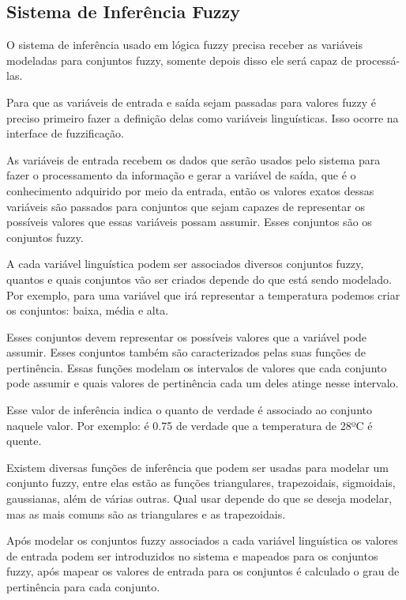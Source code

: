 \documentclass[
	article,			%
	11pt,				%
	oneside,			%
	a4paper,			%
	english,			%
	brazil,				%
	sumario=tradicional
	]{abntex2}
\begin{document}
\begin{multicols}{2}
\subsection{Sistema de Inferência Fuzzy}

O sistema de inferência usado em lógica fuzzy precisa receber as variáveis modeladas para conjuntos fuzzy, somente depois disso ele será capaz de processá-las.

Para que as variáveis de entrada e saída sejam passadas para valores fuzzy é preciso primeiro fazer a definição delas como variáveis linguísticas. Isso ocorre na interface de fuzzificação.

As variáveis de entrada recebem os dados que serão usados pelo sistema para fazer o processamento da informação e gerar a variável de saída, que é o conhecimento adquirido por meio da entrada, então os valores exatos dessas variáveis são passados para conjuntos que sejam capazes de representar os possíveis valores que essas variáveis possam assumir. Esses conjuntos são os conjuntos fuzzy.

A cada variável linguística podem ser associados diversos conjuntos fuzzy, quantos e quais conjuntos vão ser criados depende do que está sendo modelado. Por exemplo, para uma variável que irá representar a temperatura podemos criar os conjuntos: baixa, média e alta.

Esses conjuntos devem representar os possíveis valores que a variável pode assumir. Esses conjuntos também são caracterizados pelas suas funções de pertinência. Essas funções modelam os intervalos de valores que cada conjunto pode assumir e quais valores de pertinência cada um deles atinge nesse intervalo.

Esse valor de inferência indica o quanto de verdade é associado ao conjunto naquele valor. Por exemplo: é 0.75 de verdade que a temperatura de 28ºC é quente.

Existem diversas funções de inferência que podem ser usadas para modelar um conjunto fuzzy, entre elas estão as funções triangulares, trapezoidais, sigmoidais, gaussianas, além de várias outras. Qual usar depende do que se deseja modelar, mas as mais comuns são as triangulares e as trapezoidais.

Após modelar os conjuntos fuzzy associados a cada variável linguística os valores de entrada podem ser introduzidos no sistema e mapeados para os conjuntos fuzzy, após mapear os valores de entrada para os conjuntos é calculado o grau de pertinência para cada conjunto.


\end{multicols}
\end{document}
